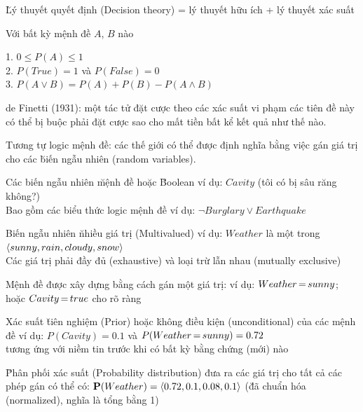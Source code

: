 \documentclass[fleqn]{article}
\begin{document}
\begin{huge}
\u{Lý thuyết quyết định (Decision theory)} = lý thuyết hữu ích + lý thuyết xác suất




Với bất kỳ mệnh đề $A$, $B$ nào

1. $0 \leq P(A) \leq 1$\\
2. $P(True) = 1$ và $P(False) = 0$\\
3. $P(A \lor B) = P(A) + P(B) - P(A\land B)$

\vspace*{0.2in}

\textwidth
{}

de Finetti (1931): một tác tử đặt cược theo các xác suất vi phạm
các tiên đề này có thể bị buộc phải đặt cược sao cho mất tiền bất kể kết quả như thế nào.





Tương tự logic mệnh đề: các thế giới có thể được định nghĩa bằng việc gán
giá trị cho các \u{biến ngẫu nhiên (random variables)}.

Các biến ngẫu nhiên \u{mệnh đề} hoặc \u{Boolean}\al
  ví dụ: $Cavity$ (tôi có bị sâu răng không?)\\
Bao gồm các biểu thức logic mệnh đề\al
  ví dụ: $\lnot Burglary \lor Earthquake$

Biến ngẫu nhiên \u{nhiều giá trị (Multivalued)}\al
  ví dụ: $Weather$ là một trong $\langle sunny,rain,cloudy,snow\rangle$\\
Các giá trị phải đầy đủ (exhaustive) và loại trừ lẫn nhau (mutually exclusive)

Mệnh đề được xây dựng bằng cách gán một giá trị:\al
ví dụ: $Weather {\,{=}\,} sunny$; hoặc $Cavity {\,{=}\,} true$ cho rõ ràng




Xác suất \u{tiên nghiệm (Prior)} hoặc \u{không điều kiện (unconditional)} của các mệnh đề\al
  ví dụ: $P(Cavity) = 0.1$ và $P(Weather {\,{=}\,} sunny) = 0.72$\\
tương ứng với niềm tin trước khi có bất kỳ bằng chứng (mới) nào

\u{Phân phối xác suất (Probability distribution)} đưa ra các giá trị cho tất cả các phép gán có thể có:\al
  $\mbox{{\bf P}}(Weather) = \langle0.72,0.1,0.08,0.1\rangle$ (\u{đã chuẩn hóa (normalized)}, nghĩa là tổng bằng 1)


\end{huge}
\end{document}
